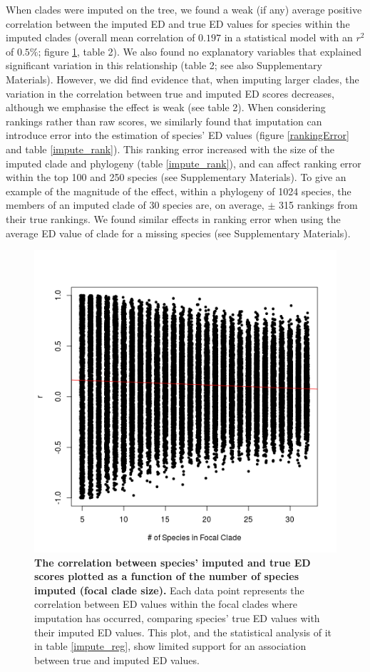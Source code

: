 \documentclass[10pt,english]{article}
\begin{document}
When clades were imputed on the tree, we found a weak (if any) average
positive correlation between the imputed ED and true ED values for
species within the imputed clades (overall mean correlation of
$0.197$ in a statistical model with an $r^2$ of
$0.5\%$; figure \ref{imputationTrend}, table 2). We also found no
explanatory variables that explained significant variation in this
relationship (table 2; see also Supplementary Materials). However, we
did find evidence that, when imputing larger clades, the variation in
the correlation between true and imputed ED scores decreases, although
we emphasise the effect is weak (see table 2). When
considering rankings rather than raw scores, we similarly found that
imputation can introduce error into the estimation of species' ED
values (figure \ref{rankingError} and table \ref{impute_rank}). This
ranking error increased with the size of the imputed clade and
phylogeny (table \ref{impute_rank}), and can affect ranking error
within the top 100 and 250 species (see Supplementary Materials). To
give an example of the magnitude of the effect, within a phylogeny of
1024 species, the members of an imputed clade of 30 species are, on
average,
$\pm$ 315 rankings from their true rankings. We found
similar effects in ranking error when using the average ED value of
clade for a missing species (see Supplementary Materials).

\begin{figure}[!ht]
  \center
  \includegraphics[width=.5\textwidth]{edModel.png}
  \caption{\textbf{The correlation between species' imputed and true
      ED scores plotted as a function of the number of species imputed
      (focal clade size).} Each data point represents the correlation
    between ED values within the focal clades where imputation has
    occurred, comparing species' true ED values with their imputed ED
    values. This plot, and the statistical analysis of it in table
    \ref{impute_reg}, show limited support for an association between
    true and imputed ED values.}
  \label{imputationTrend}
\end{figure}
\end{document}
